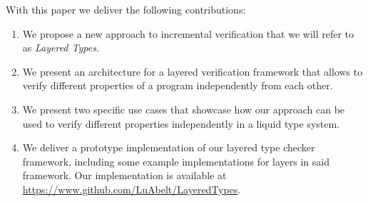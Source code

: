 With this paper we deliver the following contributions:

\begin{enumerate}
	\item We propose a new approach to incremental verification that we will refer to as \textit{Layered Types}.
	\item We present an architecture for a layered verification framework that allows to verify different properties of a program independently from each other.
	\item We present two specific use cases that showcase how our approach can be used to verify different properties independently in a liquid type system.
	\item We deliver a prototype implementation of our layered type checker framework, including some example implementations for layers in said framework. Our implementation is available at \url{https://www.github.com/LuAbelt/LayeredTypes}.
\end{enumerate}
